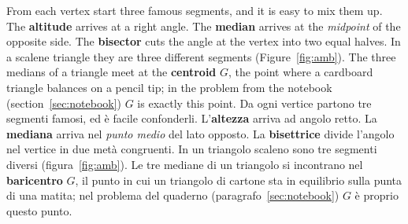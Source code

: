 \begin{bi}
From each vertex start three famous segments, and it is easy to mix them up. The \textbf{altitude} arrives at a right angle. The \textbf{median} arrives at the \emph{midpoint} of the opposite side. The \textbf{bisector} cuts the angle at the vertex into two equal halves. In a scalene triangle they are three different segments (Figure~\ref{fig:amb}). The three medians of a triangle meet at the \textbf{centroid} $G$, the point where a cardboard triangle balances on a pencil tip; in the problem from the notebook (section~\ref{sec:notebook}) $G$ is exactly this point.
\IT
Da ogni vertice partono tre segmenti famosi, ed è facile confonderli. L'\textbf{altezza} arriva ad angolo retto. La \textbf{mediana} arriva nel \emph{punto medio} del lato opposto. La \textbf{bisettrice} divide l'angolo nel vertice in due metà congruenti. In un triangolo scaleno sono tre segmenti diversi (figura~\ref{fig:amb}). Le tre mediane di un triangolo si incontrano nel \textbf{baricentro} $G$, il punto in cui un triangolo di cartone sta in equilibrio sulla punta di una matita; nel problema del quaderno (paragrafo~\ref{sec:notebook}) $G$ è proprio questo punto.
\end{bi}

